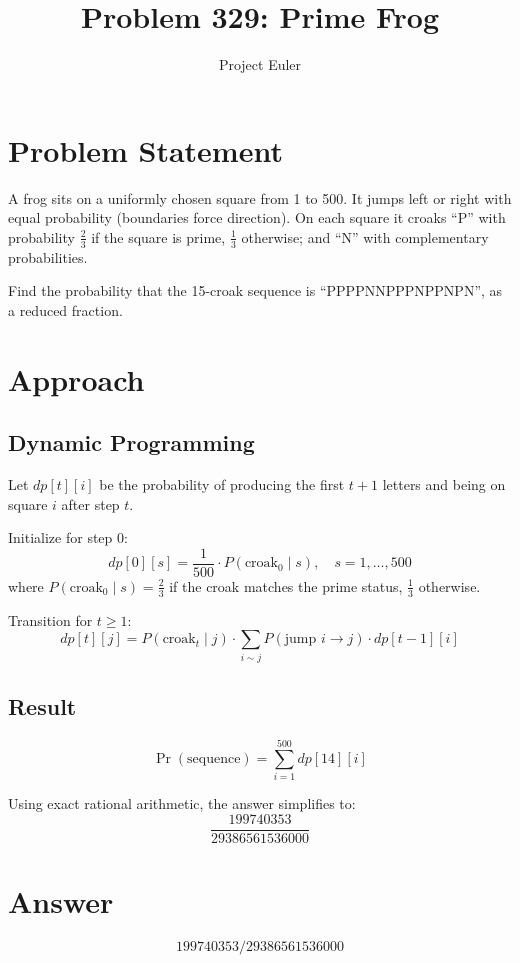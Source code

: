 \documentclass{article}
\title{Problem 329: Prime Frog}
\author{Project Euler}
\date{}
\begin{document}
\maketitle

\section{Problem Statement}
A frog sits on a uniformly chosen square from 1 to 500. It jumps left or right with equal probability (boundaries force direction). On each square it croaks ``P'' with probability $\frac{2}{3}$ if the square is prime, $\frac{1}{3}$ otherwise; and ``N'' with complementary probabilities.

Find the probability that the 15-croak sequence is ``PPPPNNPPPNPPNPN'', as a reduced fraction.

\section{Approach}

\subsection{Dynamic Programming}
Let $dp[t][i]$ be the probability of producing the first $t+1$ letters and being on square $i$ after step $t$.

Initialize for step 0:
\[
dp[0][s] = \frac{1}{500} \cdot P(\text{croak}_0 \mid s), \quad s = 1, \ldots, 500
\]
where $P(\text{croak}_0 \mid s) = \frac{2}{3}$ if the croak matches the prime status, $\frac{1}{3}$ otherwise.

Transition for $t \geq 1$:
\[
dp[t][j] = P(\text{croak}_t \mid j) \cdot \sum_{i \sim j} P(\text{jump } i \to j) \cdot dp[t-1][i]
\]

\subsection{Result}
\[
\Pr(\text{sequence}) = \sum_{i=1}^{500} dp[14][i]
\]

Using exact rational arithmetic, the answer simplifies to:
\[
\frac{199740353}{29386561536000}
\]

\section{Answer}

\[
\boxed{199740353/29386561536000}
\]
\end{document}
